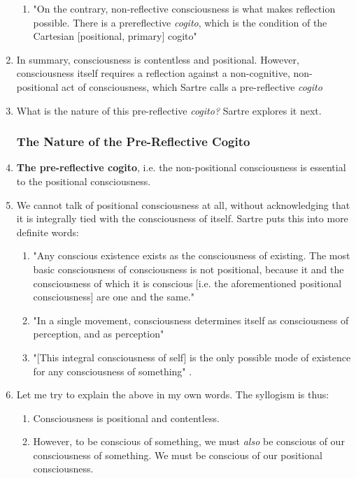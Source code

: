 \begin{enumerate}
  \begin{enumerate}
    \item "On the contrary, non-reflective consciousness is what makes reflection possible. There is a prereflective \emph{cogito}, which is the condition of the Cartesian [positional, primary] cogito" \autocite[12]{sartre}
  \end{enumerate}
  \item In summary, consciousness is contentless and positional. However, consciousness itself requires a reflection against a non-cognitive, non-positional act of consciousness, which Sartre calls a pre-reflective \emph{cogito}
  \item What is the nature of this pre-reflective \emph{cogito?} Sartre explores it next.

  \subsubsection{The Nature of the Pre-Reflective Cogito}
  \item \textbf{The pre-reflective cogito}, i.e. the non-positional consciousness is essential to the positional consciousness.
  \item We cannot talk of positional consciousness at all, without acknowledging that it is integrally tied with the consciousness of itself. Sartre puts this into more definite words:
  \begin{enumerate}
    \item "Any conscious existence exists as the consciousness of existing. The most basic consciousness of consciousness is not positional, because it and the consciousness of which it is conscious [i.e. the aforementioned positional consciousness] are one and the same."
    \item "In a single movement, consciousness determines itself as consciousness of perception, and as perception" \autocite[12]{sartre}
    \item "[This integral consciousness of self] is the only possible mode of existence for any consciousness of something" \autocite[13]{sartre}.
  \end{enumerate}
  \item Let me try to explain the above in my own words. The syllogism is thus:
  \begin{enumerate}
    \item Consciousness is positional and contentless.
    \item However, to be conscious of something, we must \emph{also} be conscious of our consciousness of something. We must be conscious of our positional consciousness.

\end{enumerate}
\end{enumerate}
